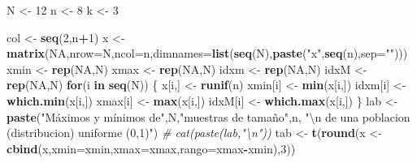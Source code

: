 \documentclass[]{book}
\newenvironment{Shaded}{\begin{snugshade}}{\end{snugshade}}
\newcommand{\CharTok}[1]{\textcolor[rgb]{0.31,0.60,0.02}{#1}}
\newcommand{\CommentTok}[1]{\textcolor[rgb]{0.56,0.35,0.01}{\textit{#1}}}
\newcommand{\ControlFlowTok}[1]{\textcolor[rgb]{0.13,0.29,0.53}{\textbf{#1}}}
\newcommand{\DataTypeTok}[1]{\textcolor[rgb]{0.13,0.29,0.53}{#1}}
\newcommand{\DecValTok}[1]{\textcolor[rgb]{0.00,0.00,0.81}{#1}}
\newcommand{\KeywordTok}[1]{\textcolor[rgb]{0.13,0.29,0.53}{\textbf{#1}}}
\newcommand{\NormalTok}[1]{#1}
\newcommand{\OperatorTok}[1]{\textcolor[rgb]{0.81,0.36,0.00}{\textbf{#1}}}
\newcommand{\OtherTok}[1]{\textcolor[rgb]{0.56,0.35,0.01}{#1}}
\newcommand{\StringTok}[1]{\textcolor[rgb]{0.31,0.60,0.02}{#1}}
\begin{document}
\begin{Shaded}
\begin{Highlighting}[]
\NormalTok{N <-}\StringTok{ }\DecValTok{12}
\NormalTok{n <-}\StringTok{ }\DecValTok{8}
\NormalTok{k <-}\StringTok{ }\DecValTok{3}

\NormalTok{col <-}\StringTok{ }\KeywordTok{seq}\NormalTok{(}\DecValTok{2}\NormalTok{,n}\OperatorTok{+}\DecValTok{1}\NormalTok{)}
\NormalTok{x <-}\StringTok{ }\KeywordTok{matrix}\NormalTok{(}\OtherTok{NA}\NormalTok{,}\DataTypeTok{nrow=}\NormalTok{N,}\DataTypeTok{ncol=}\NormalTok{n,}\DataTypeTok{dimnames=}\KeywordTok{list}\NormalTok{(}\KeywordTok{seq}\NormalTok{(N),}\KeywordTok{paste}\NormalTok{(}\StringTok{"x"}\NormalTok{,}\KeywordTok{seq}\NormalTok{(n),}\DataTypeTok{sep=}\StringTok{""}\NormalTok{)))}
\NormalTok{xmin <-}\StringTok{ }\KeywordTok{rep}\NormalTok{(}\OtherTok{NA}\NormalTok{,N)}
\NormalTok{xmax <-}\StringTok{ }\KeywordTok{rep}\NormalTok{(}\OtherTok{NA}\NormalTok{,N)}
\NormalTok{idxm <-}\StringTok{ }\KeywordTok{rep}\NormalTok{(}\OtherTok{NA}\NormalTok{,N)}
\NormalTok{idxM <-}\StringTok{ }\KeywordTok{rep}\NormalTok{(}\OtherTok{NA}\NormalTok{,N)}
\ControlFlowTok{for}\NormalTok{(i }\ControlFlowTok{in} \KeywordTok{seq}\NormalTok{(N)) \{}
\NormalTok{    x[i,] <-}\StringTok{ }\KeywordTok{runif}\NormalTok{(n)}
\NormalTok{    xmin[i] <-}\StringTok{ }\KeywordTok{min}\NormalTok{(x[i,])}
\NormalTok{    idxm[i] <-}\StringTok{ }\KeywordTok{which.min}\NormalTok{(x[i,])}
\NormalTok{    xmax[i] <-}\StringTok{ }\KeywordTok{max}\NormalTok{(x[i,])}
\NormalTok{    idxM[i] <-}\StringTok{ }\KeywordTok{which.max}\NormalTok{(x[i,])}
\NormalTok{\}}
\NormalTok{lab <-}\StringTok{ }\KeywordTok{paste}\NormalTok{(}\StringTok{"Máximos y mínimos de"}\NormalTok{,N,}\StringTok{"muestras de tamaño"}\NormalTok{,n,}
    \StringTok{"}\CharTok{\textbackslash{}n}\StringTok{ de una poblacion (distribucion) uniforme (0,1)"}\NormalTok{)}
\CommentTok{# cat(paste(lab,"\textbackslash{}n"))}
\NormalTok{tab <-}\StringTok{ }\KeywordTok{t}\NormalTok{(}\KeywordTok{round}\NormalTok{(x <-}\StringTok{ }\KeywordTok{cbind}\NormalTok{(x,}\DataTypeTok{xmin=}\NormalTok{xmin,}\DataTypeTok{xmax=}\NormalTok{xmax,}\DataTypeTok{rango=}\NormalTok{xmax}\OperatorTok{-}\NormalTok{xmin),}\DecValTok{3}\NormalTok{))}


\end{Highlighting}
\end{Shaded}
\end{document}
